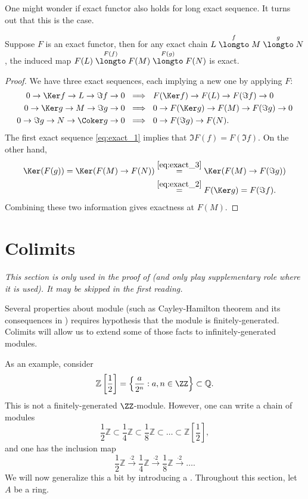 One might wonder if exact functor also holds for long exact
sequence. It turns out that this is the case.
\begin{lemma}
    Suppose $F$ is an exact functor, then
    for any exact chain $L\stackrel f\longto M\stackrel g\longto N$,
    the induced map
    $F(L)\stackrel {F(f)}\longto F(M)\stackrel {F(g)}\longto F(N)$
    is exact.
\end{lemma}
\begin{proof}
    We have three exact sequences, each implying
    a new one by applying $F$:
    \begin{align} 
    \label{eq:exact_1}
	0\to \Ker f\to L\to \Im f \to 0 &\ \implies\ 
	F(\Ker f)\to F(L) \to F(\Im f) \to 0 \\
    \label{eq:exact_2}
	0\to \Ker g \to M \to \Im g\to 0 
	 &\ \implies\ 0\to F(\Ker g)\to F(M)\to F(\Im g)\to 0\\
        \label{eq:exact_3}
	0\to \Im g \to N \to \Coker g \to 0
	 &\ \implies\ 0\to F(\Im g)\to F(N).
    \end{align}
    The first exact sequence \eqref{eq:exact_1} implies that 
    $\Im F(f) = F(\Im f)$.
    On the other hand,
    \begin{align*}
    \Ker(F(g)) = \Ker(F(M)\to F(N))
    &\stackrel{\eqref{eq:exact_3}}= 
    \Ker(F(M)\to F(\Im g)) \\
    &\stackrel{\eqref{eq:exact_2}}= F(\Ker g) = F(\Im f).
    \end{align*}
    Combining these two information gives exactness at 
    $F(M)$.
\end{proof}
\section{Colimits}
\label{sec:colimit}
\emph{This section is only used in the proof of 
(and only play supplementary role where it is used).
It may be skipped in the first reading.}

Several properties about module
(such as Cayley-Hamilton theorem and its consequences
in ) requires hypothesis that
the module is finitely-generated.
Colimits will allow us to extend some of those facts
to infinitely-generated modules.

As an example, consider
$$\mathbb Z\left[\frac 12\right] = \left\{\frac{a}{2^n} : a,n\in\ZZ\right\}
\subset \mathbb Q.$$
This is not a finitely-generated $\ZZ$-module. 
However, one can write a chain of modules
$$\frac 12\mathbb Z \subset \frac 14\mathbb Z
\subset \frac 18\mathbb Z \subset\dots \subset
\mathbb Z\left[\frac 12\right],$$
and one has the inclusion map
$$\frac 12\mathbb Z \stackrel{\cdot 2}\longrightarrow
\frac 14\mathbb Z \stackrel{\cdot 2}\longrightarrow
\frac 18\mathbb Z \stackrel{\cdot 2}\longrightarrow \dots.$$
We will now generalize this a bit by introducing a
.
Throughout this section, let $A$ be a ring.
